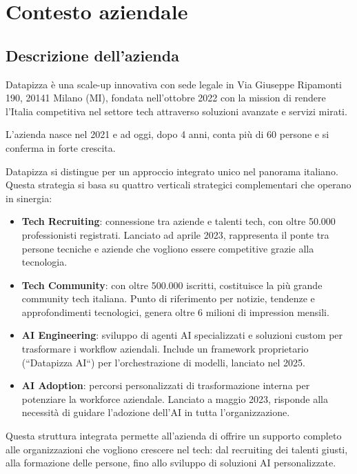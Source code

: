 \chapter{Contesto aziendale}
\sloppypar
\section{Descrizione dell'azienda}
Datapizza è una scale-up innovativa con sede legale in Via Giuseppe Ripamonti 190, 20141 Milano (MI), fondata nell'ottobre 2022 con la mission di rendere l'Italia competitiva nel settore tech attraverso soluzioni avanzate e servizi mirati.

L'azienda nasce nel 2021 e ad oggi, dopo 4 anni, conta più di 60 persone e si conferma in forte crescita.

Datapizza si distingue per un approccio integrato unico nel panorama 
italiano. Questa strategia si basa su quattro verticali strategici 
complementari che operano in sinergia:


\begin{itemize}
  \item \textbf{Tech Recruiting}: connessione tra aziende e talenti tech, con oltre 50.000 professionisti registrati. Lanciato ad aprile 2023, rappresenta il ponte tra persone tecniche e aziende che vogliono essere competitive grazie alla tecnologia.
  
  \item \textbf{Tech Community}: con oltre 500.000 iscritti, costituisce la più grande community tech italiana. Punto di riferimento per notizie, tendenze e approfondimenti tecnologici, genera oltre 6 milioni di impression mensili.
  
  \item \textbf{AI Engineering}: sviluppo di agenti AI specializzati e soluzioni custom per trasformare i workflow aziendali. Include un framework proprietario (``Datapizza AI``) per l'orchestrazione di modelli, lanciato nel 2025.
  
  \item \textbf{AI Adoption}: percorsi personalizzati di trasformazione interna per potenziare la workforce aziendale. Lanciato a maggio 2023, risponde alla necessità di guidare l'adozione dell'AI in tutta l'organizzazione.
\end{itemize}

Questa struttura integrata permette all'azienda di offrire un supporto 
completo alle organizzazioni che vogliono crescere nel tech: dal 
recruiting dei talenti giusti, alla formazione delle persone, fino allo 
sviluppo di soluzioni AI personalizzate.

